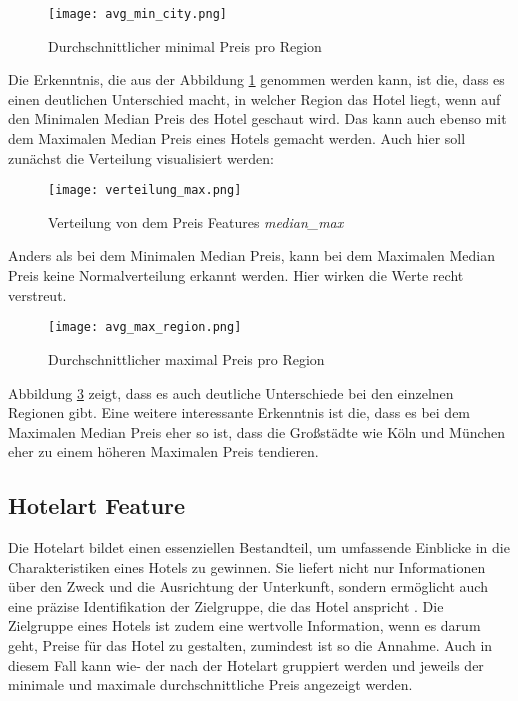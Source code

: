 \begin{figure}[h]
    \centering
    \texttt{[image: avg\_min\_city.png]}
    \caption[Durchschnittlicher minimal Preis pro Region]{Durchschnittlicher minimal Preis pro Region}
    \label{img:avg_min_city}
\end{figure}

Die Erkenntnis, die aus der Abbildung \ref{img:avg_min_city} genommen werden kann, ist die, dass es einen deutlichen Unterschied macht, in welcher Region das Hotel liegt, wenn auf den Minimalen Median Preis des Hotel geschaut wird. Das kann auch ebenso mit dem Maximalen Median Preis eines Hotels gemacht werden. Auch hier soll zunächst die Verteilung visualisiert werden:

\begin{figure}[h]
    \centering
    \texttt{[image: verteilung\_max.png]}
    \caption[Verteilung von dem Preis Features \emph{median\_max}]{Verteilung von dem Preis Features \emph{median\_max}}
    \label{img:verteilung_max}
\end{figure}

Anders als bei dem Minimalen Median Preis, kann bei dem Maximalen Median Preis keine Normalverteilung erkannt werden. Hier wirken die Werte recht verstreut.

\begin{figure}[h]
    \centering
    \texttt{[image: avg\_max\_region.png]}
    \caption[Durchschnittlicher maximal Preis pro Region]{Durchschnittlicher maximal Preis pro Region}
    \label{img:avg_max_city}
\end{figure}

Abbildung \ref{img:avg_max_city} zeigt, dass es auch deutliche Unterschiede bei den einzelnen Regionen gibt. Eine weitere interessante Erkenntnis ist die, dass es bei dem Maximalen Median Preis eher so ist, dass die Großstädte wie Köln und München eher zu einem höheren Maximalen Preis tendieren.

\subsection{Hotelart Feature}
Die Hotelart bildet einen essenziellen Bestandteil, um umfassende Einblicke in die Charakteristiken eines Hotels zu gewinnen. Sie liefert nicht nur Informationen über den Zweck und die Ausrichtung der Unterkunft, sondern ermöglicht auch eine präzise Identifikation der Zielgruppe, die das Hotel anspricht \cite{User.20.01.2024}. Die Zielgruppe eines Hotels ist zudem eine wertvolle Information, wenn es darum geht, Preise für das Hotel zu gestalten, zumindest ist so die Annahme. Auch in diesem Fall kann wie- der nach der Hotelart gruppiert werden und jeweils der minimale und maximale durchschnittliche Preis angezeigt werden.

